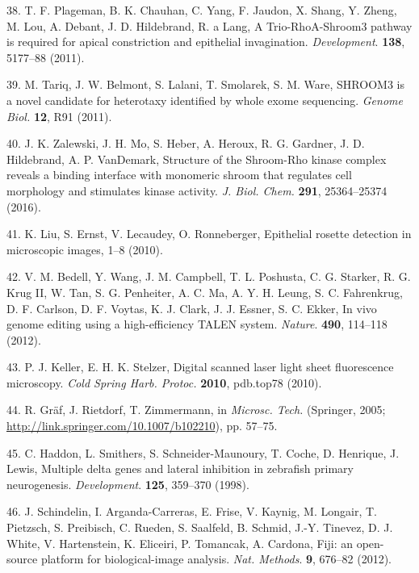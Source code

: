 \documentclass[11pt,singlespacinge,twoside]{reedthesis} %
\begin{document}
\leavevmode\hypertarget{ref-Plageman2011}{}%
38. T. F. Plageman, B. K. Chauhan, C. Yang, F. Jaudon, X. Shang, Y. Zheng, M. Lou, A. Debant, J. D. Hildebrand, R. a Lang, A Trio-RhoA-Shroom3 pathway is required for apical constriction and epithelial invagination. \emph{Development}. \textbf{138}, 5177--88 (2011).

\leavevmode\hypertarget{ref-Tariq2011}{}%
39. M. Tariq, J. W. Belmont, S. Lalani, T. Smolarek, S. M. Ware, SHROOM3 is a novel candidate for heterotaxy identified by whole exome sequencing. \emph{Genome Biol.} \textbf{12}, R91 (2011).

\leavevmode\hypertarget{ref-Zalewski2016}{}%
40. J. K. Zalewski, J. H. Mo, S. Heber, A. Heroux, R. G. Gardner, J. D. Hildebrand, A. P. VanDemark, Structure of the Shroom-Rho kinase complex reveals a binding interface with monomeric shroom that regulates cell morphology and stimulates kinase activity. \emph{J. Biol. Chem.} \textbf{291}, 25364--25374 (2016).

\leavevmode\hypertarget{ref-Liu}{}%
41. K. Liu, S. Ernst, V. Lecaudey, O. Ronneberger, Epithelial rosette detection in microscopic images, 1--8 (2010).

\leavevmode\hypertarget{ref-Bedell2012a}{}%
42. V. M. Bedell, Y. Wang, J. M. Campbell, T. L. Poshusta, C. G. Starker, R. G. Krug II, W. Tan, S. G. Penheiter, A. C. Ma, A. Y. H. Leung, S. C. Fahrenkrug, D. F. Carlson, D. F. Voytas, K. J. Clark, J. J. Essner, S. C. Ekker, In vivo genome editing using a high-efficiency TALEN system. \emph{Nature}. \textbf{490}, 114--118 (2012).

\leavevmode\hypertarget{ref-Keller2010c}{}%
43. P. J. Keller, E. H. K. Stelzer, Digital scanned laser light sheet fluorescence microscopy. \emph{Cold Spring Harb. Protoc.} \textbf{2010}, pdb.top78 (2010).

\leavevmode\hypertarget{ref-Graf2005}{}%
44. R. Gräf, J. Rietdorf, T. Zimmermann, in \emph{Microsc. Tech.} (Springer, 2005; \url{http://link.springer.com/10.1007/b102210}), pp. 57--75.

\leavevmode\hypertarget{ref-Haddon1998}{}%
45. C. Haddon, L. Smithers, S. Schneider-Maunoury, T. Coche, D. Henrique, J. Lewis, Multiple delta genes and lateral inhibition in zebrafish primary neurogenesis. \emph{Development}. \textbf{125}, 359--370 (1998).

\leavevmode\hypertarget{ref-Schindelin2012}{}%
46. J. Schindelin, I. Arganda-Carreras, E. Frise, V. Kaynig, M. Longair, T. Pietzsch, S. Preibisch, C. Rueden, S. Saalfeld, B. Schmid, J.-Y. Tinevez, D. J. White, V. Hartenstein, K. Eliceiri, P. Tomancak, A. Cardona, Fiji: an open-source platform for biological-image analysis. \emph{Nat. Methods}. \textbf{9}, 676--82 (2012).
\end{document}

